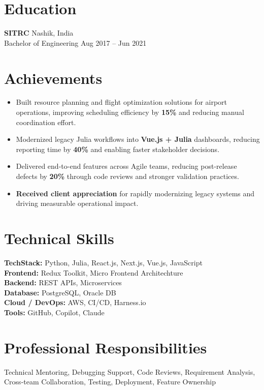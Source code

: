 \documentclass[10pt,a4paper]{article}
\begin{document}
\section*{Education}

\textbf{SITRC} \hfill Nashik, India \\
Bachelor of Engineering \hfill Aug 2017 -- Jun 2021

\section*{Achievements}

\begin{itemize}[leftmargin=*]
\item Built resource planning and flight optimization solutions for airport operations, improving scheduling efficiency by \textbf{15\%} and reducing manual coordination effort.
\item Modernized legacy Julia workflows into \textbf{Vue.js + Julia} dashboards, reducing reporting time by \textbf{40\%} and enabling faster stakeholder decisions.
\item Delivered end-to-end features across Agile teams, reducing post-release defects by \textbf{20\%} through code reviews and stronger validation practices.
\item \textbf{Received client appreciation} for rapidly modernizing legacy systems and driving measurable operational impact.
\end{itemize}

\section*{Technical Skills}

\textbf{TechStack:} Python, Julia, React.js, Next.js, Vue.js, JavaScript \\
\textbf{Frontend:} Redux Toolkit, Micro Frontend Architechture\\
\textbf{Backend:} REST APIs, Microservices \\
\textbf{Database:} PostgreSQL, Oracle DB \\
\textbf{Cloud / DevOps:} AWS, CI/CD, Harness.io \\
\textbf{Tools:} GitHub, Copilot, Claude

\section*{Professional Responsibilities}

Technical Mentoring, Debugging Support, Code Reviews, Requirement Analysis, Cross-team Collaboration, Testing, Deployment, Feature Ownership
\end{document}

